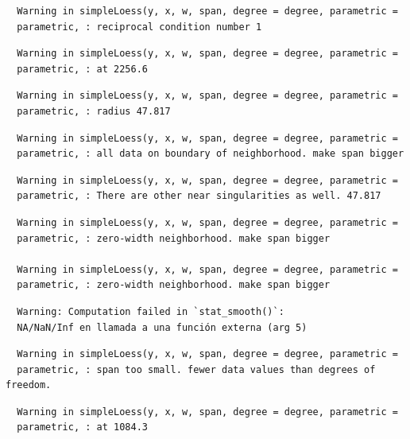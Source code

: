 \documentclass[12pt,twoside]{reedthesis}
\begin{document}
  \begin{verbatim}
  Warning in simpleLoess(y, x, w, span, degree = degree, parametric =
  parametric, : reciprocal condition number 1
  \end{verbatim}
  
  \begin{verbatim}
  Warning in simpleLoess(y, x, w, span, degree = degree, parametric =
  parametric, : at 2256.6
  \end{verbatim}
  
  \begin{verbatim}
  Warning in simpleLoess(y, x, w, span, degree = degree, parametric =
  parametric, : radius 47.817
  \end{verbatim}
  
  \begin{verbatim}
  Warning in simpleLoess(y, x, w, span, degree = degree, parametric =
  parametric, : all data on boundary of neighborhood. make span bigger
  \end{verbatim}
  
  \begin{verbatim}
  Warning in simpleLoess(y, x, w, span, degree = degree, parametric =
  parametric, : There are other near singularities as well. 47.817
  \end{verbatim}
  
  \begin{verbatim}
  Warning in simpleLoess(y, x, w, span, degree = degree, parametric =
  parametric, : zero-width neighborhood. make span bigger
  
  Warning in simpleLoess(y, x, w, span, degree = degree, parametric =
  parametric, : zero-width neighborhood. make span bigger
  \end{verbatim}
  
  \begin{verbatim}
  Warning: Computation failed in `stat_smooth()`:
  NA/NaN/Inf en llamada a una función externa (arg 5)
  \end{verbatim}
  
  \begin{verbatim}
  Warning in simpleLoess(y, x, w, span, degree = degree, parametric =
  parametric, : span too small. fewer data values than degrees of freedom.
  \end{verbatim}
  
  \begin{verbatim}
  Warning in simpleLoess(y, x, w, span, degree = degree, parametric =
  parametric, : at 1084.3
  \end{verbatim}
  
\end{document}
